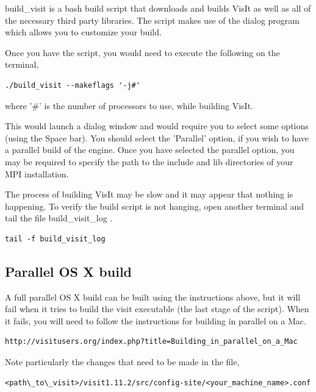 \documentclass[12pt]{article}
\begin{document}
build\_visit is a bash build script that downloads and builds VisIt as well as all of the necessary third party libraries. The script makes use of the dialog program which allows you to customize your build.

Once you have the script, you would need to execute the following on the terminal,

\begin{Verbatim}[fontsize=\footnotesize]
./build_visit --makeflags '-j#'
\end{Verbatim}
	
\normalfont where '\#' is the number of processors to use, while building VisIt. 

This would launch a dialog window and would require you to select some options (using the Space bar). You should select the 'Parallel' option, if you wish to have a parallel build of the engine. Once you have selected the parallel option, you may be required to specify the path to the include and lib directories of your MPI installation. 

The process of building VisIt may be slow and it may appear that nothing is happening. To verify the build script is not hanging, open another terminal and tail the file build\_visit\_log	. 

\begin{Verbatim}[fontsize=\footnotesize]
tail -f build_visit_log
\end{Verbatim}

\normalfont  
\subsection{Parallel OS X build}
\label{sec:ParallelOSXBuild}

A full parallel OS X build can be built using the instructions above, but it will fail when it tries to build the visit executable (the last stage of the script). When it fails, you will need to follow the instructions for building in parallel on a Mac. 

\begin{Verbatim}[fontsize=\footnotesize]
http://visitusers.org/index.php?title=Building_in_parallel_on_a_Mac
\end{Verbatim}
  
Note particularly the changes that need to be made in the file, 

\begin{Verbatim}[fontsize=\footnotesize]
<path\_to\_visit>/visit1.11.2/src/config-site/<your_machine_name>.conf
\end{Verbatim}
\end{document}

